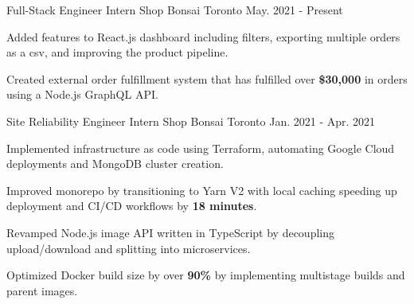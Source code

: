 

\begin{cventries}

  \cventry
    {Full-Stack Engineer Intern} %
    {Shop Bonsai} %
    {Toronto} %
    {May. 2021 - Present} %
    {
      \begin{cvitems} %
        \item {Added features to React.js dashboard including filters, exporting multiple orders as a csv, and improving the product pipeline.}
        \item {Created external order fulfillment system that has fulfilled over \textbf{\$30,000} in orders using a Node.js GraphQL API.}
      \end{cvitems}
    }
    
  \cventry
    {Site Reliability Engineer Intern} %
    {Shop Bonsai} %
    {Toronto} %
    {Jan. 2021 - Apr. 2021} %
    {
      \begin{cvitems} %
        \item {Implemented infrastructure as code using Terraform, automating Google Cloud deployments and MongoDB cluster creation.}
        \item {Improved monorepo by transitioning to Yarn V2 with local caching speeding up deployment and CI/CD workflows by \textbf{18 minutes}.}
        \item {Revamped Node.js image API written in TypeScript by decoupling upload/download and splitting into microservices.}
        \item {Optimized Docker build size by over \textbf{90\%} by implementing multistage builds and parent images.}
      \end{cvitems}
    }
    
\end{cventries}
